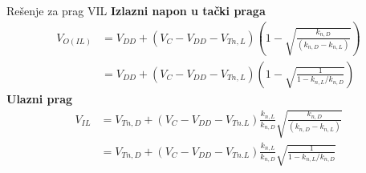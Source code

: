 \begin{frame}[label=09_1-s042]{Rešenje za prag VIL}\setlength{\parskip}{2pt}\setlength{\abovedisplayskip}{4pt}\setlength{\belowdisplayskip}{4pt}\setlength{\abovedisplayshortskip}{3pt}\setlength{\belowdisplayshortskip}{3pt}
\textbf{Izlazni napon u tački praga}\[\begin{aligned}
V_{O(IL)}&=V_{DD}+(V_C-V_{DD}-V_{Tn,L})\left(1-\sqrt{\frac{k_{n,D}}{(k_{n,D}-k_{n,L})}}\right)\\[1pt]
&=V_{DD}+(V_C-V_{DD}-V_{Tn,L})\left(1-\sqrt{\frac1{1-k_{n,L}/k_{n,D}}}\right)
\end{aligned}\]
\smallskip\textbf{Ulazni prag}\[\begin{aligned}
V_{IL}&=V_{Tn,D}+(V_C-V_{DD}-V_{Tn.L})\frac{k_{n,L}}{k_{n,D}}\sqrt{\frac{k_{n,D}}{(k_{n,D}-k_{n,L})}}\\[1pt]
&=V_{Tn,D}+(V_C-V_{DD}-V_{Tn.L})\frac{k_{n,L}}{k_{n,D}}\sqrt{\frac1{1-k_{n,L}/k_{n,D}}}
\end{aligned}\]

\end{frame}
